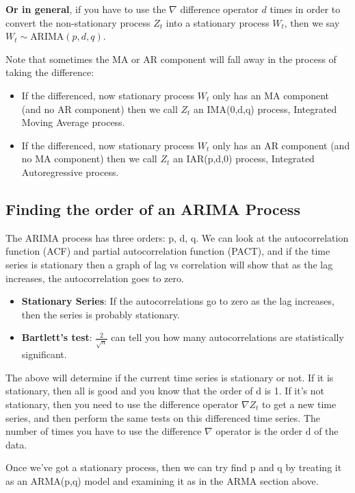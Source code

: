 \textbf{Or in general}, if you have to use the $\nabla $ difference operator
$d$ times in order to convert the non-stationary process $Z_{t}$ into a
stationary process $W_{t}$, then we say $W_{t} \sim \text{ARIMA}(p, d, q)$.

Note that sometimes the MA or AR component will fall away in the process of
taking the difference:
\begin{itemize}
    \item If the differenced, now stationary process $W_{t}$ only has an MA
        component (and no AR component) then we call $Z_{t}$ an IMA(0,d,q)
        process, Integrated Moving Average process.
    \item If the differenced, now stationary process $W_{t}$ only has an AR
        component (and no MA component) then we call $Z_{t}$ an IAR(p,d,0)
        process, Integrated Autoregressive process.
\end{itemize}
\subsection{Finding the order of an ARIMA Process}
The ARIMA process has three orders: p, d, q.  We can look at the
autocorrelation function (ACF) and partial autocorrelation function (PACT), and
if the time series is stationary then a graph of lag vs correlation will show
that as the lag increases, the autocorrelation goes to zero.

\begin{itemize}
    \item \textbf{Stationary Series}: If the autocorrelations go to zero as the
        lag increases, then the series is probably stationary.
    \item \textbf{Bartlett's test}: $\frac{2}{\sqrt{n}}$ can tell you how many
        autocorrelations are statistically significant.
\end{itemize}

The above will determine if the current time series is stationary or not. If it
is stationary, then all is good and you know that the order of d is 1. If it's
not stationary, then you need to use the difference operator $\nabla Z_{t}$ to
get a new time series, and then perform the same tests on this differenced time
series. The number of times you have to use the difference $\nabla $ operator
is the order d of the data.


Once we've got a stationary process, then we can try find p and q by treating
it as an ARMA(p,q) model and examining it as in the ARMA section above.

